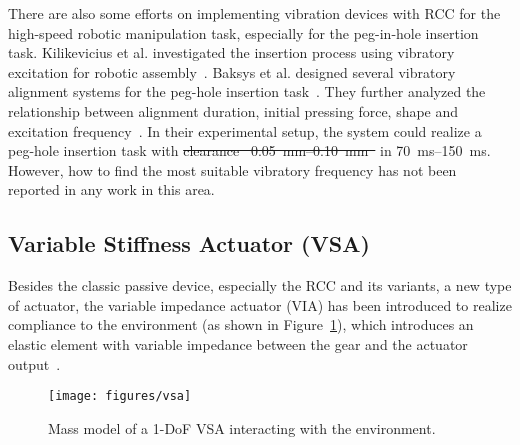 \documentclass[journal,twoside,web]{ieeecolor}
\providecommand{\DIFadd}[1]{{\protect\color{blue}\uwave{#1}}} %
\providecommand{\DIFdel}[1]{{\protect\color{red}\sout{#1}}}                      %
\providecommand{\DIFaddbegin}{} %
\providecommand{\DIFaddend}{} %
\providecommand{\DIFdelbegin}{} %
\providecommand{\DIFdelend}{} %
\newcommand{\DIFscaledelfig}{0.5}
\newlength{\DIFdelgraphicswidth} %
\newlength{\DIFdelgraphicsheight} %
\newcommand{\DIFaddincludegraphics}[2][]{{\color{blue}\fbox{\DIFOincludegraphics[#1]{#2}}}} %
\newcommand{\DIFdelincludegraphics}[2][]{%
\sbox{\DIFdelgraphicsbox}{\DIFOincludegraphics[#1]{#2}}%
\settoboxwidth{\DIFdelgraphicswidth}{\DIFdelgraphicsbox} %
\settoboxtotalheight{\DIFdelgraphicsheight}{\DIFdelgraphicsbox} %
\scalebox{\DIFscaledelfig}{%
\parbox[b]{\DIFdelgraphicswidth}{\usebox{\DIFdelgraphicsbox}\\[-\baselineskip] \rule{\DIFdelgraphicswidth}{0em}}\llap{\resizebox{\DIFdelgraphicswidth}{\DIFdelgraphicsheight}{%
\setlength{\unitlength}{\DIFdelgraphicswidth}%
\begin{picture}(1,1)%
\thicklines\linethickness{2pt} %
{\color[rgb]{1,0,0}\put(0,0){\framebox(1,1){}}}%
{\color[rgb]{1,0,0}\put(0,0){\line( 1,1){1}}}%
{\color[rgb]{1,0,0}\put(0,1){\line(1,-1){1}}}%
\end{picture}%
}\hspace*{3pt}}} %
} %
\DeclareRobustCommand{\DIFaddbegin}{\DIFOaddbegin \let\includegraphics\DIFaddincludegraphics} %
\DeclareRobustCommand{\DIFaddend}{\DIFOaddend \let\includegraphics\DIFOincludegraphics} %
\DeclareRobustCommand{\DIFdelbegin}{\DIFOdelbegin \let\includegraphics\DIFdelincludegraphics} %
\DeclareRobustCommand{\DIFdelend}{\DIFOaddend \let\includegraphics\DIFOincludegraphics} %
\begin{document}
There are also some efforts on implementing vibration devices with RCC for the high-speed robotic manipulation task, especially for the peg-in-hole insertion task. 
Kilikevicius et al. investigated the insertion process using vibratory excitation for robotic assembly~\cite{Kilikevicius2007,Kilikevicius2011}. 
Baksys et al. designed several vibratory alignment systems for the peg-hole insertion task~\cite{Baksys2008,Baksys2011}. They further analyzed the relationship between alignment duration, initial pressing force, shape and excitation frequency~\cite{Baksys2010}. 
In their experimental setup, the system could realize a peg-hole insertion task with \DIFdelbegin \DIFdel{clearance \mbox{%
\SIrange{0.05}{0.10}{\milli\meter} }\hspace{0pt}%
}\DIFdelend \DIFaddbegin \DIFadd{\mbox{%
\SIrange{0.05}{0.10}{\milli\meter} }\hspace{0pt}%
clearance }\DIFaddend in \SIrange{70}{150}{\milli\second}.
However, how to find the most suitable vibratory frequency has not been reported in any work in this area.

\subsection{Variable Stiffness Actuator (VSA)}
\label{subsec:vsa}

Besides the classic passive device, especially the RCC and its variants, a new type of actuator, the variable impedance actuator (VIA) has been introduced to realize compliance to the environment (as shown in Figure~\ref{fig:vsa}), which introduces an elastic element with variable impedance between the gear and the actuator output~\cite{Wolf2016}.

\begin{figure}[htb]
    \centering
    \texttt{[image: figures/vsa]}
    \caption{Mass model of a 1-DoF VSA interacting with the environment.}
    \label{fig:vsa}
\end{figure}
\end{document}
